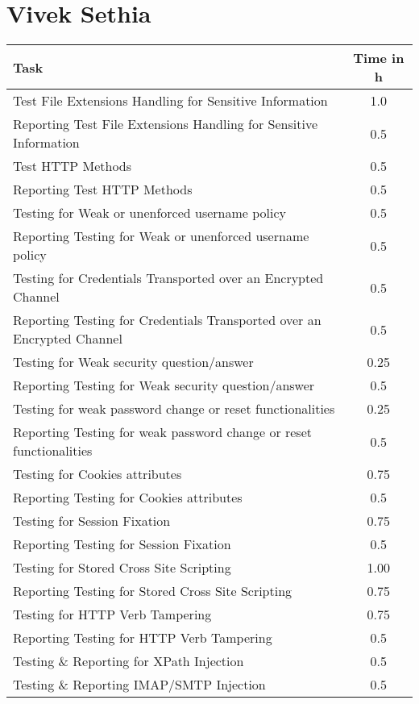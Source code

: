 \section{Vivek Sethia}
\begin{table}[H]
\tiny
\begin{tabular*}{\textwidth}{@{\extracolsep{\fill}} l c@{\extracolsep{0pt}} }
\textbf{Task} & \textbf{Time in h} \\ \hline
Test File Extensions Handling for Sensitive Information & 1.0 \\
Reporting Test File Extensions Handling for Sensitive Information & 0.5 \\
Test HTTP Methods                           & 0.5 \\
Reporting Test HTTP Methods                 & 0.5 \\
Testing for Weak or unenforced username policy & 0.5 \\
Reporting Testing for Weak or unenforced username policy & 0.5 \\
Testing for Credentials Transported over an Encrypted Channel & 0.5 \\
Reporting Testing for Credentials Transported over an Encrypted Channel & 0.5 \\
Testing for Weak security question/answer   & 0.25 \\
Reporting Testing for Weak security question/answer & 0.5 \\
Testing for weak password change or reset functionalities & 0.25 \\
Reporting Testing for weak password change or reset functionalities & 0.5 \\
Testing for Cookies attributes              & 0.75 \\
Reporting Testing for Cookies attributes    & 0.5 \\
Testing for Session Fixation                & 0.75 \\
Reporting Testing for Session Fixation      & 0.5 \\
Testing for Stored Cross Site Scripting     & 1.00 \\
Reporting Testing for Stored Cross Site Scripting & 0.75 \\
Testing for HTTP Verb Tampering             & 0.75 \\
Reporting Testing for HTTP Verb Tampering   & 0.5 \\
Testing \& Reporting for XPath Injection    & 0.5 \\
Testing \& Reporting IMAP/SMTP Injection    & 0.5 \\

\end{tabular*}
\end{table}
